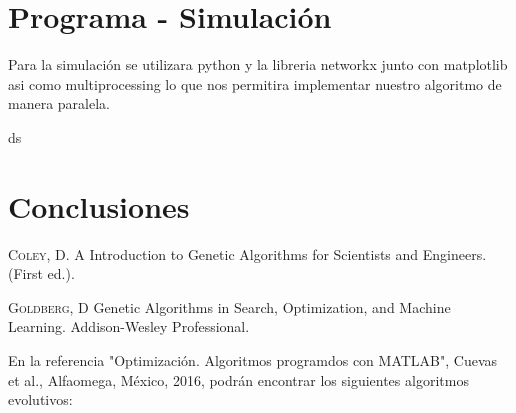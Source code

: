 \documentclass{article}
\begin{document}
\section{Programa - Simulación}
Para la simulación se utilizara python y la libreria networkx junto con matplotlib asi como multiprocessing lo que nos permitira implementar nuestro algoritmo de manera paralela.
\begin{pythoncode}
ds
\end{pythoncode}

\section{Conclusiones}

\begin{thebibliography}{}
\bibitem{}\textsc{Coley, D. A}  Introduction to Genetic Algorithms for Scientists and Engineers. (First ed.).

\bibitem{}\textsc{Goldberg, D } Genetic Algorithms in Search, Optimization, and Machine Learning. Addison-Wesley Professional.
\end{thebibliography}

\bibitem[]{}En la referencia "Optimización. Algoritmos programdos con MATLAB", Cuevas et al., Alfaomega, México, 2016, podrán encontrar los siguientes algoritmos evolutivos: 
\end{document}
